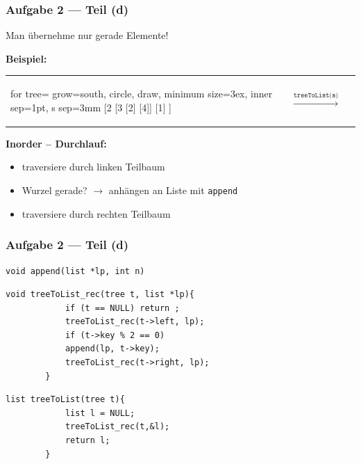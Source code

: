 \documentclass{beamer}
\begin{document}
\begin{frame}[fragile] \frametitle{Aufgabe 2 --- Teil (d)}
	Man übernehme nur gerade Elemente!
	
	\textbf{Beispiel:}
	\begin{center}
		\begin{tabularx}{\linewidth}{m{2cm} m{2cm} m{2cm}}
			\begin{forest}
				for tree={ grow=south, circle, draw, minimum size=3ex, inner sep=1pt, s sep=3mm }
				[2 	[3 [2] [4]] [1] ]
			\end{forest}
			&
			$\overset{\texttt{treeToList(s)}}{\longrightarrow}$
			&
			\begin{ttfamily}
				[2, 4, 2]
			\end{ttfamily}
		\end{tabularx}
	\end{center}
	\pause
	\textbf{Inorder -- Durchlauf:}
	\begin{itemize}
		\item traversiere durch linken Teilbaum
		\item Wurzel gerade? $\to$ anhängen an Liste mit \texttt{append}
		\item traversiere durch rechten Teilbaum
	\end{itemize}
\end{frame}

\begin{frame}[fragile] \frametitle{Aufgabe 2 --- Teil (d)}
	\begin{lstlisting}[style=notebook]
		void append(list *lp, int n)
	\end{lstlisting}
	\pause
	\begin{lstlisting}[style=notebook]
		void treeToList_rec(tree t, list *lp){
			if (t == NULL) return ;
			treeToList_rec(t->left, lp);
			if (t->key % 2 == 0)
			append(lp, t->key);
			treeToList_rec(t->right, lp);
		}	
	\end{lstlisting}
	\pause
	\begin{lstlisting}[style=notebook]
		list treeToList(tree t){
			list l = NULL;
			treeToList_rec(t,&l);
			return l;
		}
	\end{lstlisting}
\end{frame}
\end{document}
